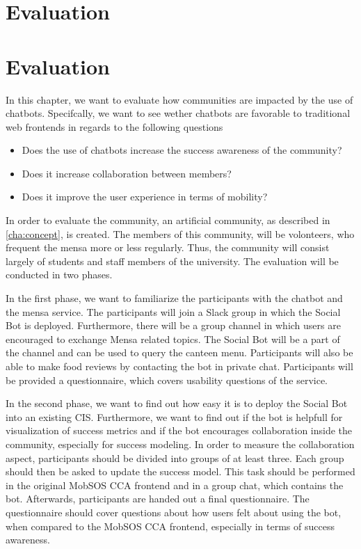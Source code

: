\chapter{Evaluation}
\chapter{Evaluation}\label{cha:eval}
In this chapter, we want to evaluate how communities are impacted by the use of chatbots.
Specifcally, we want to see wether chatbots are favorable to traditional web frontends in regards to the following questions
\begin{itemize}
    \item Does the use of chatbots increase the success awareness of the community?
    \item Does it increase collaboration between members?
    \item Does it improve the user experience in terms of mobility?
\end{itemize}

In order to evaluate the community, an artificial community, as described in \ref{cha:concept}, is created.
The members of this community, will be volonteers, who frequent the mensa more or less regularly.
Thus, the community will consist largely of students and staff members of the university.
The evaluation will be conducted in two phases.

In the first phase, we want to familiarize the participants with the chatbot and the mensa service.
The participants will join a Slack group in which the Social Bot is deployed.
Furthermore, there will be a group channel in which users are encouraged to exchange Mensa related topics. The Social Bot will be a part of the channel and can be used to query the canteen menu.
Participants will also be able to make food reviews by contacting the bot in private chat.
Participants will be provided a questionnaire, which covers usability questions of the service.

In the second phase, we want to find out how easy it is to deploy the Social Bot into an existing CIS.
Furthermore, we want to find out if the bot is helpfull for visualization of success metrics and if the bot encourages collaboration inside the community, especially for success modeling.
In order to measure the collaboration aspect, participants should be divided into groups of at least three.
Each group should then be asked to update the success model.
This task should be performed in the original MobSOS CCA frontend and in a group chat, which contains the bot.
Afterwards, participants are handed out a final questionnaire.
The questionnaire should cover questions about how users felt about using the bot, when compared to the MobSOS CCA frontend, especially in terms of success awareness.


